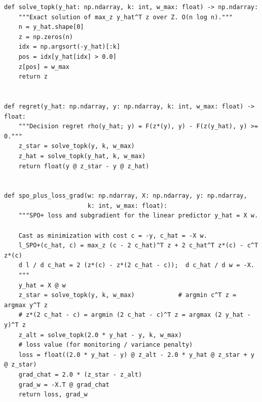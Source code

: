 \documentclass[11pt,a4paper]{article}
\theoremstyle{definition}
\theoremstyle{plain}
\begin{document}
\begin{lstlisting}[caption={The decision layer: exact oracle, regret, and the SPO+ subgradient (\texttt{risp.py}).},label={lst:dd6-decision}]
def solve_topk(y_hat: np.ndarray, k: int, w_max: float) -> np.ndarray:
    """Exact solution of max_z y_hat^T z over Z. O(n log n)."""
    n = y_hat.shape[0]
    z = np.zeros(n)
    idx = np.argsort(-y_hat)[:k]
    pos = idx[y_hat[idx] > 0.0]
    z[pos] = w_max
    return z


def regret(y_hat: np.ndarray, y: np.ndarray, k: int, w_max: float) -> float:
    """Decision regret rho(y_hat; y) = F(z*(y), y) - F(z(y_hat), y) >= 0."""
    z_star = solve_topk(y, k, w_max)
    z_hat = solve_topk(y_hat, k, w_max)
    return float(y @ z_star - y @ z_hat)


def spo_plus_loss_grad(w: np.ndarray, X: np.ndarray, y: np.ndarray,
                       k: int, w_max: float):
    """SPO+ loss and subgradient for the linear predictor y_hat = X w.

    Cast as minimization with cost c = -y, c_hat = -X w.
    l_SPO+(c_hat, c) = max_z (c - 2 c_hat)^T z + 2 c_hat^T z*(c) - c^T z*(c)
    d l / d c_hat = 2 (z*(c) - z*(2 c_hat - c));  d c_hat / d w = -X.
    """
    y_hat = X @ w
    z_star = solve_topk(y, k, w_max)            # argmin c^T z = argmax y^T z
    # z*(2 c_hat - c) = argmin (2 c_hat - c)^T z = argmax (2 y_hat - y)^T z
    z_alt = solve_topk(2.0 * y_hat - y, k, w_max)
    # loss value (for monitoring / variance penalty)
    loss = float((2.0 * y_hat - y) @ z_alt - 2.0 * y_hat @ z_star + y @ z_star)
    grad_chat = 2.0 * (z_star - z_alt)
    grad_w = -X.T @ grad_chat
    return loss, grad_w
\end{lstlisting}
\end{document}
